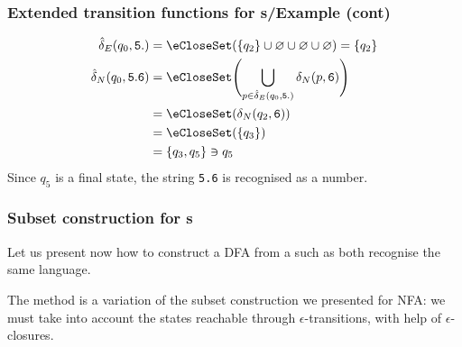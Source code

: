 % 
\begin{frame}[containsverbatim]
\frametitle{Extended transition functions for {\eNFA}s/Example (cont)}

\begin{align*}
   \hat{\delta}_E (q_0, \mathtt{5.})
&= \eCloseSet (\{q_2\} \cup \varnothing \cup \varnothing \cup
   \varnothing)
 = \{q_2\}\\
   \hat{\delta}_N (q_0, \mathtt{5.6})
&= \eCloseSet \Biggl( \bigcup_{p \in \hat{\delta}_E (q_0,
     \mathtt{5.})}{\delta_N (p, \mathtt{6})} \Biggr)\\
&= \eCloseSet (\delta_N (q_2, \mathtt{6}))\\
&= \eCloseSet (\{q_3\})\\
&= \{q_3, q_5\} \ni q_5
\end{align*}
Since \(q_5\) is a final state, the string \verb+5.6+ is recognised as
a number.

\end{frame}

% 
\begin{frame}
\frametitle{Subset construction for {\eNFA}s}

Let us present now how to construct a DFA from a \eNFA such as both
recognise the same language.

\bigskip

The method is a variation of the subset construction we presented for
NFA: we must take into account the states reachable through
\(\epsilon\)-transitions, with help of \(\epsilon\)-closures.

\end{frame}

